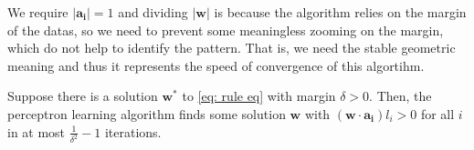 \begin{note}
    We require \(\vert \mathbf{a_i}  \vert = 1 \) and dividing \(\vert \mathbf{w}  \vert \) is because the algorithm relies on the margin of the datas, so we need to prevent some meaningless zooming on the margin, which do not help to identify the pattern. That is, we need the stable geometric meaning and thus it represents the speed of convergence of this algortihm.
\end{note}

\begin{theorem}
    Suppose there is a solution \(\mathbf{w}^*\) to \autoref{eq: rule eq} with margin \(\delta > 0\). Then, the perceptron learning algorithm finds some solution \(\mathbf{w} \) with \(\left( \mathbf{w} \cdot \mathbf{a_i}  \right) l_i > 0\) for all \(i\) in at most \(\frac{1}{\delta ^2} - 1\) iterations.      
\end{theorem}
